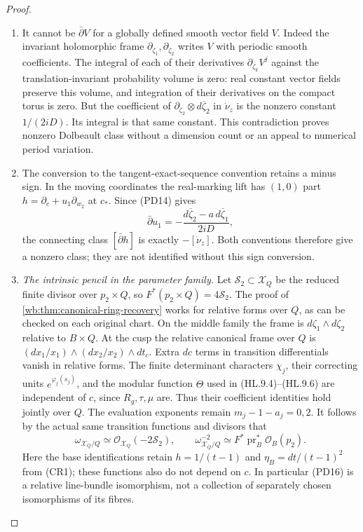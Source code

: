 \begin{proof}
\begin{enumerate}[label=\arabic*.,leftmargin=*]
\item It cannot be $\bar\partial V$ for a globally defined smooth vector
field $V$. Indeed the invariant holomorphic frame
$\partial_{\zeta_1},\partial_{\zeta_2}$ writes $V$ with periodic
smooth coefficients. The integral of each of their derivatives
$\partial_{\overline\zeta_k}V^j$ against the translation-invariant
probability volume is zero: real constant vector fields preserve this
volume, and integration of their derivatives on the compact torus is
zero. But the coefficient of
$\partial_{\zeta_2}\otimes d\overline\zeta_2$ in $\dot\nu_z$ is
the nonzero constant $1/(2iD)$. Its integral is that same constant.
This contradiction proves nonzero Dolbeault class without a dimension
count or an appeal to numerical period variation.

\item The conversion to the tangent-exact-sequence convention retains a
minus sign. In the moving coordinates the real-marking lift has
$(1,0)$ part $h=\partial_c+u_1\partial_{w_2}$ at $c_*$.
Since (PD14) gives
\[
 \bar\partial u_1=-\frac{d\overline\zeta_2-a\,d\overline\zeta_1}{2iD},
\]
the connecting class $[\bar\partial h]$ is exactly $-[\dot\nu_z]$.
Both conventions therefore give a nonzero class; they are not identified
without this sign conversion.

\item \emph{The intrinsic pencil in the parameter family.}
Let $\mathcal S_2\subset\mathcal X_Q$ be the reduced finite divisor
over $p_2\times Q$, so $F^*(p_2\times Q)=4\mathcal S_2$.
The proof of \cref{wb:thm:canonical-ring-recovery} works for relative
forms over $Q$, as can be checked on each original chart.
On the middle family the frame is $d\zeta_1\wedge d\zeta_2$ relative
to $B\times Q$. At the cusp the relative canonical frame over $Q$ is
$(dx_1/x_1)\wedge(dx_2/x_2)\wedge dt_c$.
Extra $dc$ terms in transition differentials vanish in relative forms.
The finite determinant characters $\chi_j$, their correcting units
$e^{\varphi_j(s_j)}$, and the modular function $\Theta$ used in
(HL.9.4)--(HL.9.6) are independent of $c$, since $R_g,\tau,\mu$ are.
Thus their coefficient identities hold jointly over $Q$.
The evaluation exponents remain $m_j-1-a_j=0,2$.
It follows by the actual same transition functions and divisors that
\[
 \omega_{\mathcal X_Q/Q}\simeq\mathcal O_{\mathcal X_Q}(-2\mathcal S_2),
 \qquad
 \omega_{\mathcal X_Q/Q}^{-2}\simeq
          F^*\operatorname{pr}_B^*\mathcal O_B(p_2).
 \tag{PD16}
\]
Here the base identifications retain $h=1/(t-1)$ and
$\eta_B=dt/(t-1)^2$ from (CR1); these functions also do not depend on $c$.
In particular (PD16) is a relative line-bundle isomorphism, not a
collection of separately chosen isomorphisms of its fibres.


\end{enumerate}
\end{proof}
